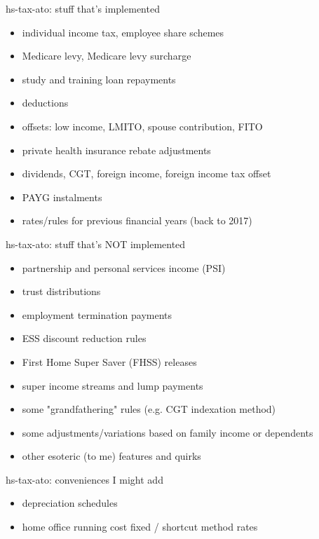 \documentclass[ignorenonframetext,aspectratio=169,12pt]{beamer}
\begin{document}
\begin{frame}{hs-tax-ato: stuff that's implemented}
\begin{itemize}
  \item individual income tax, employee share schemes
  \item Medicare levy, Medicare levy surcharge
  \item study and training loan repayments
  \item deductions
  \item offsets: low income, LMITO, spouse contribution, FITO
  \item private health insurance rebate adjustments
  \item dividends, CGT, foreign income, foreign income tax offset
  \item PAYG instalments
  \item rates/rules for previous financial years (back to 2017)
\end{itemize}
\end{frame}

\begin{frame}{hs-tax-ato: stuff that's NOT implemented}
\begin{itemize}
  \item partnership and personal services income (PSI)
  \item trust distributions
  \item employment termination payments
  \item ESS discount reduction rules
  \item First Home Super Saver (FHSS) releases
  \item super income streams and lump payments
  \item some "grandfathering" rules (e.g. CGT indexation method)
  \item some adjustments/variations based on family income or dependents
  \item other esoteric (to me) features and quirks
\end{itemize}
\end{frame}

\begin{frame}{hs-tax-ato: conveniences I might add}
\begin{itemize}
  \item depreciation schedules
  \item home office running cost fixed / shortcut method rates
\end{itemize}
\end{frame}
\end{document}
